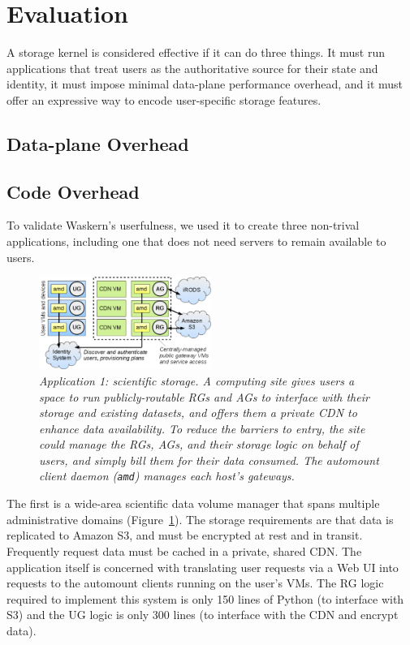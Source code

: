\section{Evaluation}

A storage kernel is considered effective if it can do three things.  It must
run applications that treat users as the authoritative source for their state and identity,
it must impose minimal data-plane performance overhead, and it must offer an expressive way to
encode user-specific storage features.

\subsection{Data-plane Overhead}



\subsection{Code Overhead}

To validate Waskern's userfulness, we used it to create three non-trival
applications, including one that does not need servers to remain available to
users.

\begin{figure}[t!]
\centering
\includegraphics[width=0.5\textwidth]{figures/science-cloud}
\caption{\it Application 1: scientific storage.  A computing site gives users a
   space to run publicly-routable RGs and AGs to interface with their storage
   and existing datasets, and offers them a private CDN to enhance data
   availability.  To reduce the barriers to entry, the site could manage the
   RGs, AGs, and their storage logic on behalf of users, and simply bill them
   for their data consumed.  The automount client daemon (\texttt{amd}) manages
   each host's gateways.}
\label{fig:science-cloud}
\end{figure}


The first is a wide-area scientific data volume manager that spans
multiple administrative domains (Figure~\ref{fig:science-cloud}). The storage requirements are that
data is replicated to Amazon S3, and must be encrypted at rest and in transit.
Frequently request data must be cached in a private, shared CDN. The application
itself is concerned with translating user requests via a Web UI into requests to
the automount clients running on the user's VMs. The RG logic required to
implement this system is only 150 lines of Python (to interface with S3) and the
UG logic is only 300 lines (to interface with the CDN and encrypt data).

